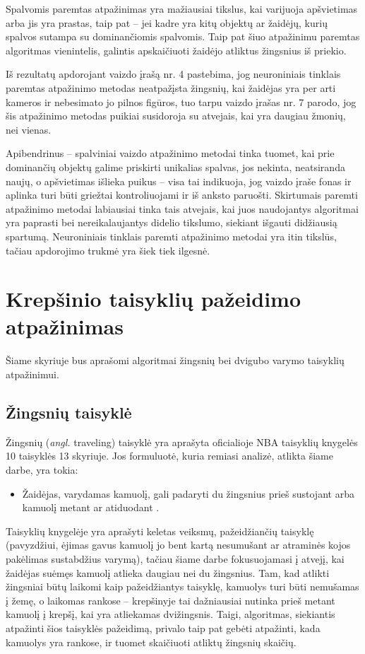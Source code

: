 \documentclass{VUMIFPSbakalaurinis}
\begin{document}
Spalvomis paremtas atpažinimas yra mažiausiai tikslus, kai varijuoja apšvietimas arba jis yra prastas, taip pat – jei kadre yra kitų objektų ar žaidėjų, kurių spalvos sutampa su dominančiomis spalvomis. Taip pat šiuo atpažinimu paremtas algoritmas vienintelis, galintis apskaičiuoti žaidėjo atliktus žingsnius iš priekio. 

Iš rezultatų apdorojant vaizdo įrašą nr. 4 pastebima, jog neuroniniais tinklais paremtas atpažinimo metodas neatpažįsta žingsnių, kai žaidėjas yra per arti kameros ir nebesimato jo pilnos figūros, tuo tarpu vaizdo įrašas nr. 7 parodo, jog šis atpažinimo metodas puikiai susidoroja su atvejais, kai yra daugiau žmonių, nei vienas. 

Apibendrinus – spalviniai vaizdo atpažinimo metodai tinka tuomet, kai prie dominančių objektų galime priskirti unikalias spalvas, jos nekinta, neatsiranda naujų, o apšvietimas išlieka puikus – visa tai indikuoja, jog vaizdo įraše fonas ir aplinka turi būti griežtai kontroliuojami ir iš anksto paruošti. Skirtumais paremti atpažinimo metodai labiausiai tinka tais atvejais, kai juos naudojantys algoritmai yra paprasti bei nereikalaujantys didelio tikslumo, siekiant išgauti didžiausią spartumą. Neuroniniais tinklais paremti atpažinimo metodai yra itin tikslūs, tačiau apdorojimo trukmė yra šiek tiek ilgesnė.

\section{Krepšinio taisyklių pažeidimo atpažinimas}

Šiame skyriuje bus aprašomi algoritmai žingsnių bei dvigubo varymo taisyklių atpažinimui.

\subsection{Žingsnių taisyklė}
Žingsnių (\textit{angl.} traveling) taisyklė yra aprašyta oficialioje NBA taisyklių knygelės 10 taisyklės 13 skyriuje. Jos formuluotė, kuria remiasi analizė, atlikta šiame darbe, yra tokia: 

\begin{itemize}
	\item Žaidėjas, varydamas kamuolį, gali padaryti du žingsnius prieš sustojant arba kamuolį metant ar atiduodant \cite{nba-rules}. 
\end{itemize}

Taisyklių knygelėje yra aprašyti keletas veiksmų, pažeidžiančių taisyklę (pavyzdžiui, ėjimas gavus kamuolį jo bent kartą nesumušant ar atraminės kojos pakėlimas sustabdžius varymą), tačiau šiame darbe fokusuojamasi į atvejį, kai žaidėjas suėmęs kamuolį atlieka daugiau nei du žingsnius. Tam, kad atlikti žingsniai būtų laikomi kaip pažeidžiantys taisyklę, kamuolys turi būti nemušamas į žemę, o laikomas rankose – krepšinyje tai dažniausiai nutinka prieš metant kamuolį į krepšį, kai yra atliekamas dvižingsnis. Taigi, algoritmas, siekiantis atpažinti šios taisyklės pažeidimą, privalo taip pat gebėti atpažinti, kada kamuolys yra rankose, ir tuomet skaičiuoti atliktų žingsnių skaičių. 
\end{document}
